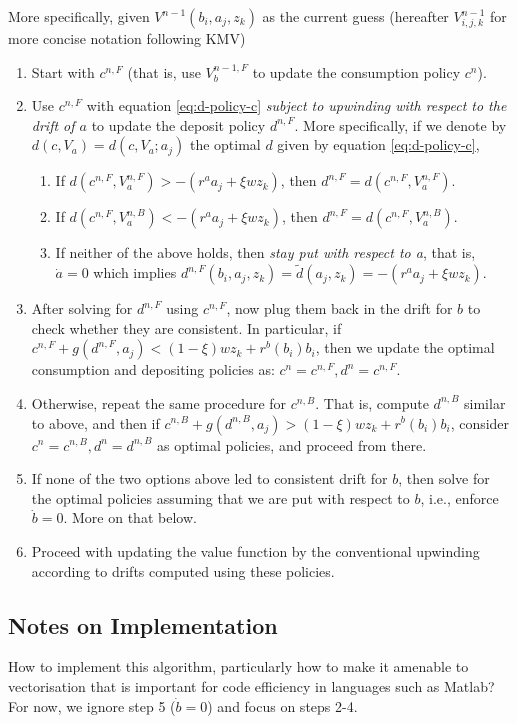 \documentclass[11pt]{article}
\begin{document}
More specifically, given \(V^{n-1}(b_i,a_j,z_k)\) as the current guess (hereafter \(V_{i,j,k}^{n-1}\) for more concise notation following KMV)
\begin{enumerate}
\item Start with \(c^{n,F}\) (that is, use \(V_b^{n-1,F}\) to update the consumption policy \(c^n\)).
\item Use \(c^{n,F}\) with equation \eqref{eq:d-policy-c} \emph{subject to upwinding with respect to the drift of \(a\)} to update the deposit policy \(d^{n,F}\). More specifically, if we denote by \(d(c,V_a)=d(c,V_a;a_j)\) the optimal \(d\) given by equation \eqref{eq:d-policy-c},
\begin{enumerate}
\item If \(d(c^{n,F}, V_a^{n,F}) > -(r^a a_j + \xi w z_k)\), then \(d^{n,F} = d(c^{n,F}, V_{a}^{n,F})\).
\item If \(d(c^{n,F}, V_a^{n,B}) < -(r^a a_j + \xi w z_k)\), then \(d^{n,F}= d(c^{n,F}, V_{a}^{n,B})\).
\item If neither of the above holds, then \emph{stay put with respect to a}, that is, \(\dot{a} = 0\) which implies \(d^{n,F}(b_i, a_j, z_k) = \tilde{d}(a_j, z_k) = - (r^a a_j + \xi w z_k)\).
\end{enumerate}
\item After solving for \(d^{n,F}\) using \(c^{n,F}\), now plug them back in the drift for \(b\) to check whether they are consistent. In particular, if \(c^{n,F} + g(d^{n,F}, a_j) < (1-\xi) w z_k + r^b(b_i) b_i\), then we update the optimal consumption and depositing policies as: \(c^n = c^{n,F}, d^n = c^{n,F}\).
\item Otherwise, repeat the same procedure for \(c^{n,B}\). That is, compute \(d^{n,B}\) similar to above, and then if \(c^{n,B} + g(d^{n,B}, a_j) > (1-\xi) w z_k + r^b(b_i) b_i\), consider \(c^n = c^{n,B}, d^n = d^{n,B}\) as optimal policies, and proceed from there.
\item If none of the two options above led to consistent drift for \(b\), then solve for the optimal policies assuming that we are put with respect to \(b\), i.e., enforce \(\dot{b} = 0\). More on that below.
\item Proceed with updating the value function by the conventional upwinding according to drifts computed using these policies.
\end{enumerate}

\subsection{Notes on Implementation}
\label{sec:org613628c}
How to implement this algorithm, particularly how to make it amenable to vectorisation that is important for code efficiency in languages such as Matlab? For now, we ignore step 5 (\(\dot{b} = 0\)) and focus on steps 2-4.
\end{document}
